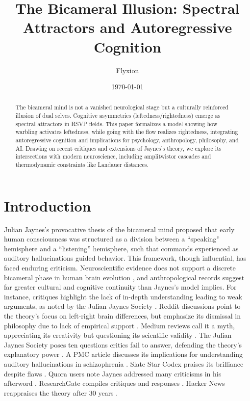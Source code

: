 \documentclass[a4paper,11pt]{article}
\title{The Bicameral Illusion: Spectral Attractors and Autoregressive Cognition}
\author{Flyxion}
\date{\today}
\begin{document}
\maketitle

\begin{abstract}
The bicameral mind is not a vanished neurological stage but a culturally reinforced illusion of dual selves. Cognitive asymmetries (leftedness/rightedness) emerge as spectral attractors in RSVP fields. This paper formalizes a model showing how warbling activates leftedness, while going with the flow realizes rightedness, integrating autoregressive cognition and implications for psychology, anthropology, philosophy, and AI. Drawing on recent critiques and extensions of Jaynes's theory, we explore its intersections with modern neuroscience, including amplitwistor cascades and thermodynamic constraints like Landauer distances.
\end{abstract}

\section{Introduction}

Julian Jaynes’s provocative thesis of the bicameral mind \citep{jaynes1976origin} proposed that early human consciousness was structured as a division between a ``speaking'' hemisphere and a ``listening'' hemisphere, such that commands experienced as auditory hallucinations guided behavior. This framework, though influential, has faced enduring criticism. Neuroscientific evidence does not support a discrete bicameral phase in human brain evolution \citep{McVeigh2018}, and anthropological records suggest far greater cultural and cognitive continuity than Jaynes’s model implies. For instance, critiques highlight the lack of in-depth understanding leading to weak arguments, as noted by the Julian Jaynes Society \citep{jaynescritiquesgeneral}. Reddit discussions point to the theory's focus on left-right brain differences, but emphasize its dismissal in philosophy due to lack of empirical support \citep{redditjaynescritique}. Medium reviews call it a myth, appreciating its creativity but questioning its scientific validity \citep{mediumbicameralmyth}. The Julian Jaynes Society poses ten questions critics fail to answer, defending the theory's explanatory power \citep{jaynesquestionscritics}. A PMC article discusses its implications for understanding auditory hallucinations in schizophrenia \citep{pmcbicameral}. Slate Star Codex praises its brilliance despite flaws \citep{slatestarcodexjaynes}. Quora users note Jaynes addressed many criticisms in his afterword \citep{quorajaynes}. ResearchGate compiles critiques and responses \citep{researchgatejaynescritiques}. Hacker News reappraises the theory after 30 years \citep{hackernewsbicameral}.
\end{document}

